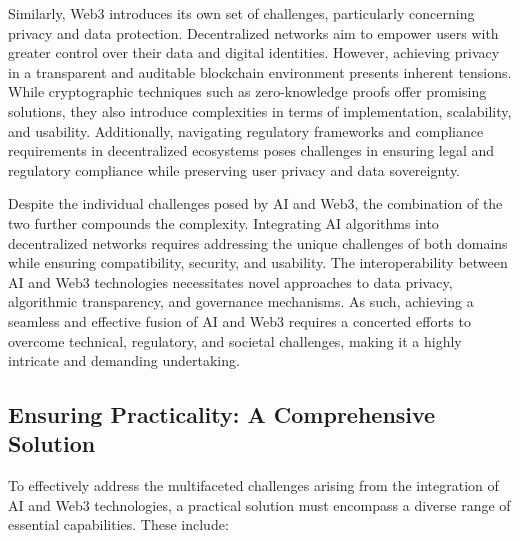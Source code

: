 \documentclass[conference]{IEEEtran}
\begin{document}
Similarly, Web3 introduces its own set of challenges, particularly concerning privacy and data protection. Decentralized networks aim to empower users with greater control over their data and digital identities. However, achieving privacy in a transparent and auditable blockchain environment presents inherent tensions. While cryptographic techniques such as zero-knowledge proofs offer promising solutions, they also introduce complexities in terms of implementation, scalability, and usability. Additionally, navigating regulatory frameworks and compliance requirements in decentralized ecosystems poses challenges in ensuring legal and regulatory compliance while preserving user privacy and data sovereignty.

Despite the individual challenges posed by AI and Web3, the combination of the two further compounds the complexity. Integrating AI algorithms into decentralized networks requires addressing the unique challenges of both domains while ensuring compatibility, security, and usability. The interoperability between AI and Web3 technologies necessitates novel approaches to data privacy, algorithmic transparency, and governance mechanisms. As such, achieving a seamless and effective fusion of AI and Web3 requires a concerted efforts to overcome technical, regulatory, and societal challenges, making it a highly intricate and demanding undertaking.

\subsection{Ensuring Practicality: A Comprehensive Solution}

To effectively address the multifaceted challenges arising from the integration of AI and Web3 technologies, a practical solution must encompass a diverse range of essential capabilities. These include:
\end{document}
